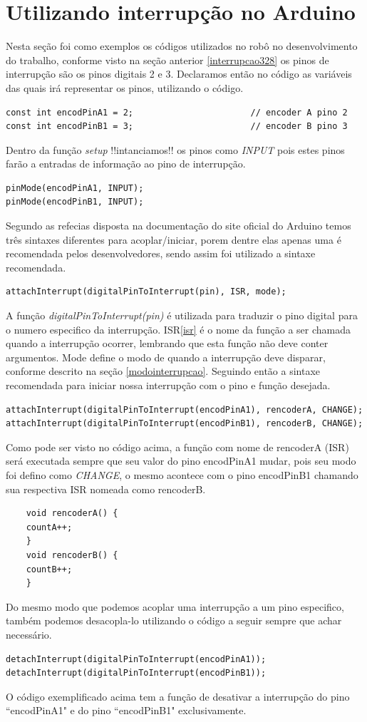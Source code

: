 \documentclass[a4paper,12pt,portuguese]{ufms-cpcx}
\begin{document}
\section{Utilizando interrupção no Arduino}
Nesta seção foi como exemplos os códigos utilizados no robô no desenvolvimento do trabalho, conforme visto na seção anterior \ref{interrupcao328} os pinos de interrupção são os pinos digitais 2 e 3. Declaramos então no código as variáveis das quais irá representar os pinos, utilizando o código.
\begin{lstlisting}
const int encodPinA1 = 2;                       // encoder A pino 2
const int encodPinB1 = 3;                       // encoder B pino 3
\end{lstlisting}
Dentro da função \textit{setup} !!intanciamos!! os pinos como \textit{INPUT} pois estes pinos farão a entradas de informação ao pino de interrupção.
\begin{lstlisting}
pinMode(encodPinA1, INPUT);
pinMode(encodPinB1, INPUT);
\end{lstlisting}
Segundo as refecias disposta na documentação do site oficial do Arduino temos três sintaxes diferentes para acoplar\//iniciar, porem dentre elas apenas uma é recomendada pelos desenvolvedores, sendo assim foi utilizado a sintaxe recomendada.
\begin{lstlisting}
attachInterrupt(digitalPinToInterrupt(pin), ISR, mode);
\end{lstlisting}
A função \textit{digitalPinToInterrupt(pin)} é utilizada para traduzir o pino digital para o numero especifico da interrupção.
ISR\ref{isr} é o nome da função a ser chamada quando a interrupção ocorrer, lembrando que esta função não deve conter argumentos.
Mode define o modo de quando a interrupção deve disparar, conforme descrito na seção \ref{modointerrupcao}.
Seguindo então a sintaxe recomendada para iniciar nossa interrupção com o pino e função desejada.
\begin{lstlisting}
attachInterrupt(digitalPinToInterrupt(encodPinA1), rencoderA, CHANGE);
attachInterrupt(digitalPinToInterrupt(encodPinB1), rencoderB, CHANGE);
\end{lstlisting}
Como pode ser visto no código acima, a função com nome de rencoderA (ISR) será executada sempre que seu valor do pino encodPinA1 mudar, pois seu modo foi defino como \textit{CHANGE}, o mesmo acontece com o pino encodPinB1 chamando sua respectiva ISR nomeada como rencoderB. 
\begin{lstlisting}
	void rencoderA() {
	countA++;
	}
	void rencoderB() {
	countB++;
	}
\end{lstlisting}
Do mesmo modo que podemos acoplar uma interrupção a um pino especifico, também podemos desacopla-lo utilizando o código a seguir sempre que achar necessário.
\begin{lstlisting}
detachInterrupt(digitalPinToInterrupt(encodPinA1));
detachInterrupt(digitalPinToInterrupt(encodPinB1));
\end{lstlisting}
O código exemplificado acima tem a função de desativar a interrupção do pino ``encodPinA1" e do pino ``encodPinB1" exclusivamente.
\end{document}
